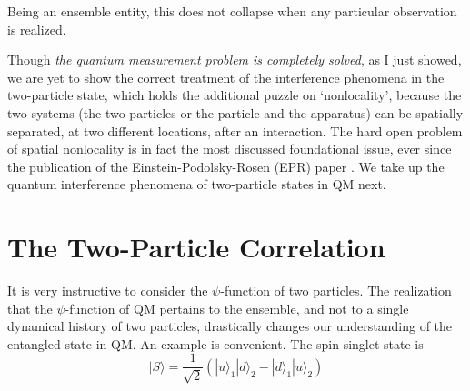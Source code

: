 Being an ensemble entity, this does not collapse when any particular observation is realized.

Though \textit{the quantum measurement problem is completely solved}, as I just showed, we are
yet to show the correct treatment of the interference phenomena in the two-particle state,
which holds the additional puzzle on `nonlocality', because the two systems (the two particles
or the particle and the apparatus) can be spatially separated, at two different locations, after
an interaction. The hard open problem of spatial nonlocality is in fact the most discussed
foundational issue, ever since the publication of the Einstein-Podolsky-Rosen (EPR) paper
\cite{chap27-key9}. We take up the quantum interference phenomena of two-particle states in QM next.

\section{The Two-Particle Correlation}%

It is very instructive to consider the $\psi$-function of two particles. The realization that the
$\psi$-function of QM pertains to the ensemble, and not to a single dynamical history of two
particles, drastically changes our understanding of the entangled state in QM. An example
is convenient. The spin-singlet state is
\begin{equation*}
|S\rangle = \frac{1}{\sqrt{2}} (|u \rangle_1 | d \rangle_2 - | d \rangle_1 |u\rangle_2) \tag{33}
\end{equation*}

